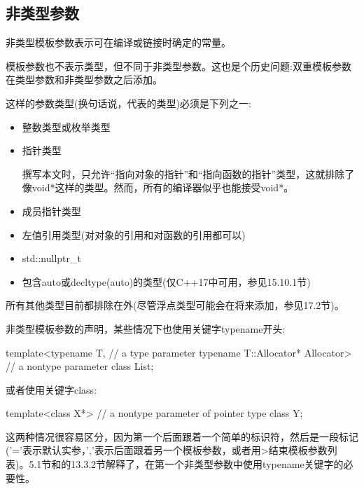 \subsection{非类型参数}

非类型模板参数表示可在编译或链接时确定的常量。

\begin{notice}模板参数也不表示类型，但不同于非类型参数。这也是个历史问题:双重模板参数在类型参数和非类型参数之后添加。
\end{notice}

这样的参数类型(换句话说，代表的类型)必须是下列之一:

\begin{itemize}
\item 
整数类型或枚举类型

\item 
指针类型

\begin{notice}撰写本文时，只允许“指向对象的指针”和“指向函数的指针”类型，这就排除了像void*这样的类型。然而，所有的编译器似乎也能接受void*。
\end{notice}

\item 
成员指针类型

\item
左值引用类型(对对象的引用和对函数的引用都可以)

\item 
std::nullptr\_t

\item 
包含auto或decltype(auto)的类型(仅C++17中可用，参见15.10.1节)
\end{itemize}

所有其他类型目前都排除在外(尽管浮点类型可能会在将来添加，参见17.2节)。

非类型模板参数的声明，某些情况下也使用关键字typename开头:

\begin{cpp}
template<typename T, // a type parameter
		typename T::Allocator* Allocator> // a nontype parameter
class List;
\end{cpp}

或者使用关键字class:

\begin{cpp}
template<class X*> // a nontype parameter of pointer type
class Y;
\end{cpp}

这两种情况很容易区分，因为第一个后面跟着一个简单的标识符，然后是一段标记('='表示默认实参，','表示后面跟着另一个模板参数，或者用>结束模板参数列表)。5.1节和的13.3.2节解释了，在第一个非类型参数中使用typename关键字的必要性。

